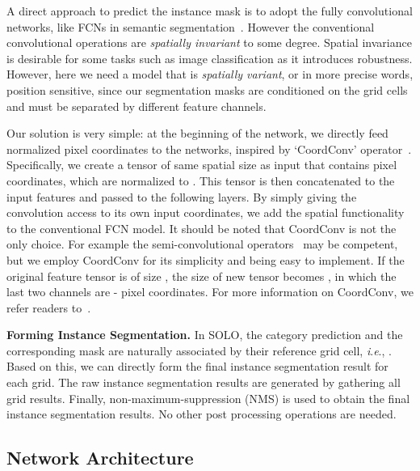 \documentclass[runningheads]{llncs}
\def\method{{SOLO}\xspace}
\newcommand{\myparagraph}[1]{{ \noindent \bf #1}}
\newcommand{\ie}{\textit{i}.\textit{e}.}
\begin{document}
A direct approach to predict the instance mask is to adopt the fully convolutional networks, like FCNs in semantic segmentation~\cite{fcn}. However the conventional convolutional operations are \textit{spatially  invariant} to some degree.
Spatial invariance is desirable for some tasks such as image classification
as it introduces robustness. However,
here
we need a model that is \textit{spatially variant},
or in more precise words, position sensitive,
since our segmentation masks are conditioned on the grid cells and must be separated by different feature channels.

Our solution is very simple:
at the beginning of the network, we directly feed normalized pixel coordinates to the
networks, inspired  by  `CoordConv' operator~\cite{coordconv}. Specifically, we create a tensor of same spatial size as input that contains pixel coordinates,
which are  normalized to .
This tensor is then concatenated to the input features and passed to the following layers. By simply giving  the convolution access to its own input coordinates, we add the spatial functionality to the conventional FCN model.
It should be noted that CoordConv is not the only choice. For example the semi-convolutional operators~\cite{semiconv}  may  be competent, but we employ CoordConv for its simplicity and being easy to implement. If the original feature tensor is of size , the size of new tensor becomes , in which the last two channels are - pixel coordinates. For more information on CoordConv, we refer readers to~\cite{coordconv}.

\myparagraph{Forming Instance Segmentation.}
In \method, the category prediction and the corresponding mask are naturally associated by their reference grid cell, \ie, . Based on this, we can directly form the final instance segmentation result for each grid. The raw instance segmentation results are generated by gathering all grid results. Finally, non-maximum-suppression (NMS) is used to
obtain the final instance segmentation results. No other post processing operations are
needed.




\subsection{Network Architecture}
\end{document}
